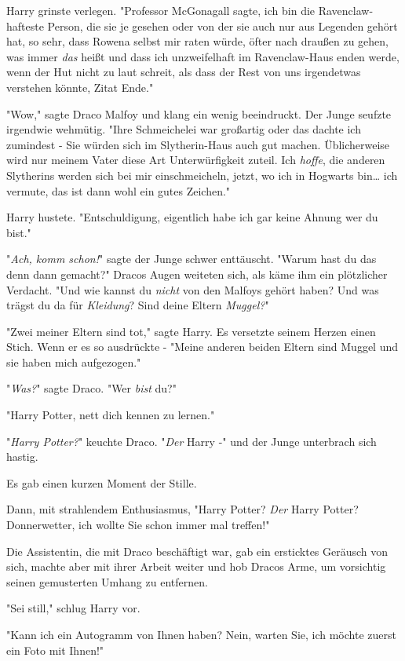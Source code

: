 {Harry grinste verlegen. "Professor McGonagall sagte, ich bin die Ravenclaw-hafteste Person, die sie je gesehen oder von der sie auch nur aus Legenden gehört hat, so sehr, dass Rowena selbst mir raten würde, öfter nach draußen zu gehen, was immer \emph{das} heißt und dass ich unzweifelhaft im Ravenclaw-Haus enden werde, wenn der Hut nicht zu laut schreit, als dass der Rest von uns irgendetwas verstehen könnte, Zitat Ende."

"Wow," sagte Draco Malfoy und klang ein wenig beeindruckt. Der Junge seufzte irgendwie wehmütig. "Ihre Schmeichelei war großartig oder das dachte ich zumindest - Sie würden sich im Slytherin-Haus auch gut machen. Üblicherweise wird nur meinem Vater diese Art Unterwürfigkeit zuteil. Ich \emph{hoffe}, die anderen Slytherins werden sich bei mir einschmeicheln, jetzt, wo ich in Hogwarts bin… ich vermute, das ist dann wohl ein gutes Zeichen."

Harry hustete. "Entschuldigung, eigentlich habe ich gar keine Ahnung wer du bist."

"\emph{Ach, komm schon!}" sagte der Junge schwer enttäuscht. "Warum hast du das denn dann gemacht?" Dracos Augen weiteten sich, als käme ihm ein plötzlicher Verdacht. "Und wie kannst du \emph{nicht} von den Malfoys gehört haben? Und was trägst du da für \emph{Kleidung}? Sind deine Eltern \emph{Muggel?}"

"Zwei meiner Eltern sind tot," sagte Harry. Es versetzte seinem Herzen einen Stich. Wenn er es so ausdrückte - "Meine anderen beiden Eltern sind Muggel und sie haben mich aufgezogen."

"\emph{Was?}" sagte Draco. "Wer \emph{bist} du?"

"Harry Potter, nett dich kennen zu lernen."

"\emph{Harry Potter?}" keuchte Draco. "\emph{Der} Harry -" und der Junge unterbrach sich hastig.

Es gab einen kurzen Moment der Stille.

Dann, mit strahlendem Enthusiasmus, "Harry Potter? \emph{Der} Harry Potter? Donnerwetter, ich wollte Sie schon immer mal treffen!"

Die Assistentin, die mit Draco beschäftigt war, gab ein ersticktes Geräusch von sich, machte aber mit ihrer Arbeit weiter und hob Dracos Arme, um vorsichtig seinen gemusterten Umhang zu entfernen.

"Sei still," schlug Harry vor.

"Kann ich ein Autogramm von Ihnen haben? Nein, warten Sie, ich möchte zuerst ein Foto mit Ihnen!"

}
